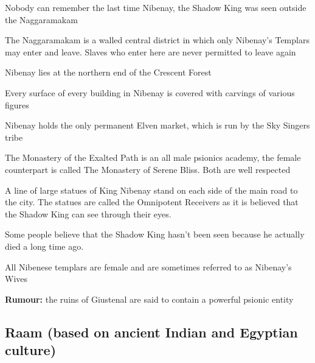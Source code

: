 \begin{description}
    \item Nobody can remember the last time Nibenay, the Shadow King was seen outside the Naggaramakam
    \item The Naggaramakam is a walled central district in which only Nibenay’s Templars may enter and leave. Slaves who enter here are never permitted to leave again
    \item Nibenay lies at the northern end of the Crescent Forest
    \item Every surface of every building in Nibenay is covered with carvings of various figures
    \item Nibenay holds the only permanent Elven market, which is run by the Sky Singers tribe
    \item The Monastery of the Exalted Path is an all male psionics academy, the female counterpart is called The Monastery of Serene Bliss. Both are well respected
    \item A line of large statues of King Nibenay stand on each side of the main road to the city. The statues are called the Omnipotent Receivers as it is believed that the Shadow King can see through their eyes.
    \item Some people believe that the Shadow King hasn’t been seen because he actually died a long time ago.
    \item All Nibenese templars are female and are sometimes referred to as Nibenay’s Wives
    \item \textbf{Rumour:} the ruins of Giustenal are said to contain a powerful psionic entity
\end{description}

\subsection{Raam (based on ancient Indian and Egyptian culture)}

